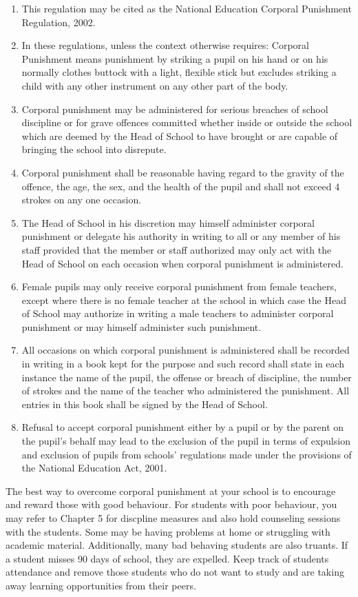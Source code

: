 \begin{enumerate}
\item This regulation may be cited as the National Education Corporal Punishment Regulation, 2002.
\item In these regulations, unless the context otherwise requires: Corporal Punishment means punishment by striking a pupil on his hand or on his normally clothes buttock with a light, flexible stick but excludes striking a child with any other instrument on any other part of the body.
\item Corporal punishment may be administered for serious breaches of school discipline or for grave offences committed whether inside or outside the school which are deemed by the Head of School to have brought or are capable of bringing the school into disrepute.
\item Corporal punishment shall be reasonable having regard to the gravity of the offence, the age, the sex, and the health of the pupil and shall not exceed 4 strokes on any one occasion.
\item The Head of School in his discretion may himself administer corporal punishment or delegate his authority in writing to all or any member of his staff provided that the member or staff authorized may only act with the Head of School on each occasion when corporal punishment is administered.
\item Female pupils may only receive corporal punishment from female teachers, except where there is no female teacher at the school in which case the Head of School may authorize in writing a male teachers to administer corporal punishment or may himself administer such punishment.
\item All occasions on which corporal punishment is administered shall be recorded in writing in a book kept for the purpose and such record shall state in each instance the name of the pupil, the offense or breach of discipline, the number of strokes and the name of the teacher who administered the punishment. All entries in this book shall be signed by the Head of School.
\item Refusal to accept corporal punishment either by a pupil or by the parent on the pupil's behalf may lead to the exclusion of the pupil in terms of expulsion and exclusion of pupils from schools' regulations made under the provisions of the National Education Act, 2001.
\end{enumerate}

The best way to overcome corporal punishment at your school is to encourage and reward those with good behaviour.  For students with poor behaviour, you may refer to Chapter 5 for discpline measures and also hold counseling sessions with the students.  Some may be having problems at home or struggling with academic material. Additionally, many bad behaving students are also truants. If a student misses 90 days of school, they are expelled.  Keep track of students attendance and remove those students who do not want to study and are taking away learning opportunities from their peers.
 

